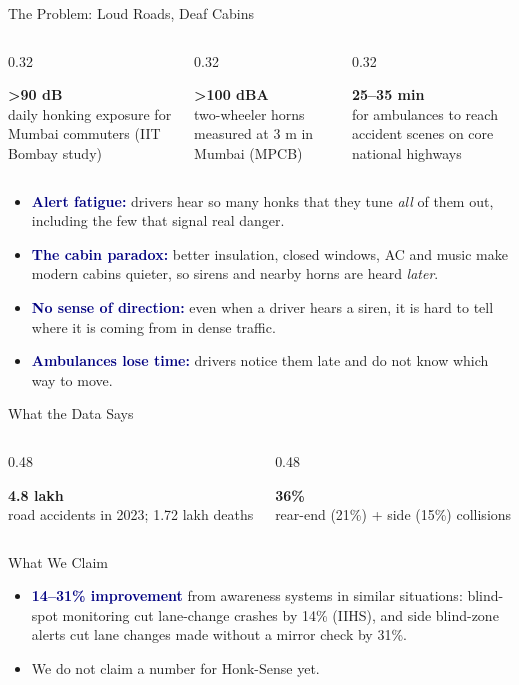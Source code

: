 \documentclass[aspectratio=169,10pt,t,xcolor=table]{beamer}
\newcommand{\hl}[1]{\textcolor{navy}{\textbf{#1}}}
\newcommand{\bignum}[2]{%
  \begin{minipage}[t]{\linewidth}\centering
    {\fontsize{26}{28}\selectfont\color{alert}\textbf{#1}}\\[2pt]
    {\small #2}
  \end{minipage}}
\begin{document}
\begin{frame}{The Problem: Loud Roads, Deaf Cabins}
\begin{columns}[T]
\begin{column}{0.32\textwidth}
\bignum{\textgreater 90 dB}{daily honking exposure for Mumbai commuters (IIT Bombay study)}
\end{column}
\begin{column}{0.32\textwidth}
\bignum{\textgreater 100 dBA}{two-wheeler horns measured at 3 m in Mumbai (MPCB)}
\end{column}
\begin{column}{0.32\textwidth}
\bignum{25--35 min}{for ambulances to reach accident scenes on core national highways}
\end{column}
\end{columns}
\vspace{4pt}
\begin{itemize}\small
  \item \hl{Alert fatigue:} drivers hear so many honks that they tune \emph{all} of them out, including the few that signal real danger.
  \item \hl{The cabin paradox:} better insulation, closed windows, AC and music make modern cabins quieter, so sirens and nearby horns are heard \emph{later}.
  \item \hl{No sense of direction:} even when a driver hears a siren, it is hard to tell where it is coming from in dense traffic.
  \item \hl{Ambulances lose time:} drivers notice them late and do not know which way to move.
\end{itemize}
\end{frame}

\begin{frame}{What the Data Says}
\begin{columns}[T]
\begin{column}{0.48\textwidth}
\bignum{4.8 lakh}{road accidents in 2023; 1.72 lakh deaths}
\end{column}
\begin{column}{0.48\textwidth}
\bignum{36\%}{rear-end (21\%) + side (15\%) collisions}
\end{column}
\end{columns}
\vspace{14pt}
\begin{block}{What We Claim}
\begin{itemize}\small
  \item \hl{14--31\% improvement} from awareness systems in similar situations: blind-spot monitoring cut lane-change crashes by 14\% (IIHS), and side blind-zone alerts cut lane changes made without a mirror check by 31\%.
  \item We do not claim a number for Honk-Sense yet.
\end{itemize}
\end{block}
\end{frame}
\end{document}
